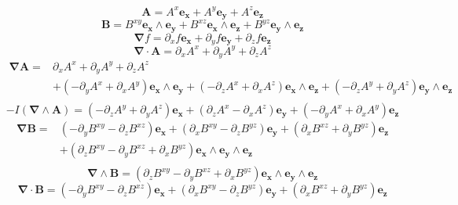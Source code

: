\documentclass[12pt]{report}
\newcommand{\bm}[1]{\boldsymbol{#1}}
\newcommand{\W}{\wedge}
\begin{document}
\begin{equation*} \bm{A} = A^{x}\bm{e_{x}}+A^{y}\bm{e_{y}}+A^{z}\bm{e_{z}} \end{equation*}
\begin{equation*} \bm{B} = B^{xy}\bm{e_{x}\W e_{y}}+B^{xz}\bm{e_{x}\W e_{z}}+B^{yz}\bm{e_{y}\W e_{z}} \end{equation*}
\begin{equation*} \bm{\nabla}  f = \partial_{x} f\bm{e_{x}}+\partial_{y} f\bm{e_{y}}+\partial_{z} f\bm{e_{z}} \end{equation*}
\begin{equation*} \bm{\nabla} \cdot \bm{A} = \partial_{x} A^{x} + \partial_{y} A^{y} + \partial_{z} A^{z} \end{equation*}
 \begin{align*} \bm{\nabla}  \bm{A} =  & \partial_{x} A^{x} + \partial_{y} A^{y} + \partial_{z} A^{z} \\  & +\left ( - \partial_{y} A^{x} + \partial_{x} A^{y}\right ) \bm{e_{x}\W e_{y}}+\left ( - \partial_{z} A^{x} + \partial_{x} A^{z}\right ) \bm{e_{x}\W e_{z}}+\left ( - \partial_{z} A^{y} + \partial_{y} A^{z}\right ) \bm{e_{y}\W e_{z}} \\ \end{align*} 
\begin{equation*} -I (\bm{\nabla} \W \bm{A}) = \left ( - \partial_{z} A^{y} + \partial_{y} A^{z}\right ) \bm{e_{x}}+\left ( \partial_{z} A^{x} - \partial_{x} A^{z}\right ) \bm{e_{y}}+\left ( - \partial_{y} A^{x} + \partial_{x} A^{y}\right ) \bm{e_{z}} \end{equation*}
 \begin{align*} \bm{\nabla}  \bm{B} =  & \left ( - \partial_{y} B^{xy} - \partial_{z} B^{xz}\right ) \bm{e_{x}}+\left ( \partial_{x} B^{xy} - \partial_{z} B^{yz}\right ) \bm{e_{y}}+\left ( \partial_{x} B^{xz} + \partial_{y} B^{yz}\right ) \bm{e_{z}} \\  & +\left ( \partial_{z} B^{xy} - \partial_{y} B^{xz} + \partial_{x} B^{yz}\right ) \bm{e_{x}\W e_{y}\W e_{z}} \\ \end{align*} 
\begin{equation*} \bm{\nabla} \W \bm{B} = \left ( \partial_{z} B^{xy} - \partial_{y} B^{xz} + \partial_{x} B^{yz}\right ) \bm{e_{x}\W e_{y}\W e_{z}} \end{equation*}
\begin{equation*} \bm{\nabla} \cdot \bm{B} = \left ( - \partial_{y} B^{xy} - \partial_{z} B^{xz}\right ) \bm{e_{x}}+\left ( \partial_{x} B^{xy} - \partial_{z} B^{yz}\right ) \bm{e_{y}}+\left ( \partial_{x} B^{xz} + \partial_{y} B^{yz}\right ) \bm{e_{z}} \end{equation*}
\end{document}
